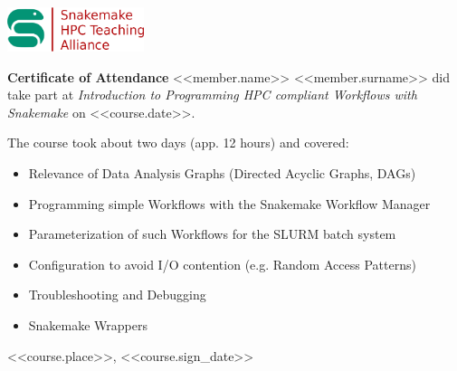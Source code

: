 \documentclass[a4paper,10pt]{article}
\begin{document}
\pagestyle{empty}
\begin{multicols}{2}
 \begin{minipage}{\textwidth}
  \includegraphics[width=4cm]{../images/logos/alliance_logo.png}
 \end{minipage}

 \columnbreak
\end{multicols}


\begin{center}
 \vfill
 \huge{\bf Certificate of Attendance}
 \vfill
 \Large{<<member.name>> <<member.surname>>}
 \vfill
 did take part at 
 \vfill
 \emph{Introduction to Programming HPC compliant Workflows with Snakemake}
 \vfill
 on <<course.date>>.
 \vfill
\end{center}

The course took about two days (app. 12 hours) and covered:
\begin{itemize}
  \item Relevance of Data Analysis Graphs (Directed Acyclic Graphs, DAGs)
  \item Programming simple Workflows with the Snakemake Workflow Manager
  \item Parameterization of such Workflows for the SLURM batch system
  \item Configuration to avoid I/O contention (e.g. Random Access Patterns)
  \item Troubleshooting and Debugging
  \item Snakemake Wrappers
\end{itemize}

\vfill
<<course.place>>, <<course.sign_date>>
\end{document}
